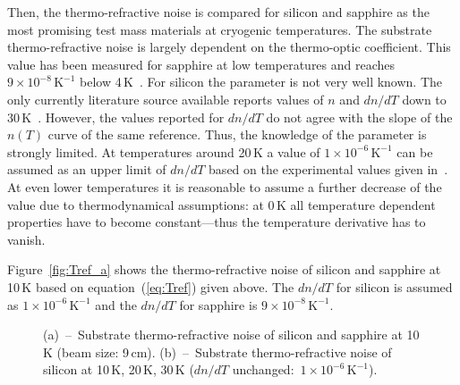 Then, the thermo-refractive noise is compared for silicon and sapphire as the most promising test mass materials at cryogenic temperatures. The substrate thermo-refractive noise is largely dependent on the thermo-optic coefficient. This value has been measured for sapphire at low temperatures and reaches $9\times 10^{-8}\,\mathrm{K}^{-1}$ below 4\,K~\cite{Tomaru2002a}. For silicon the parameter is not very well known. The only currently literature source available reports values of $n$ and $dn/dT$ down to 30\,K~\cite{Frey2006}. However, the values reported for $dn/dT$ do not agree with the slope of the $n(T)$ curve of the same reference. Thus, the knowledge of the parameter is strongly limited. At temperatures around 20\,K a value of $1\times10^{-6}\,\mathrm{K}^{-1}$ can be assumed as an upper limit of $dn/dT$ based on the experimental values given in~\cite{Frey2006}. At even lower temperatures it is reasonable to assume a further decrease of the value due to thermodynamical assumptions: at 0\,K all temperature dependent properties have to become constant---thus the temperature derivative has to vanish.

Figure~\ref{fig:Tref_a} shows the thermo-refractive noise of silicon and sapphire at 10\,K based on equation~(\ref{eq:Tref}) given above. The $dn/dT$ for silicon is assumed as $1\times10^{-6}\,\mathrm{K}^{-1}$ and the $dn/dT$ for sapphire is $9\times10^{-8}\,\mathrm{K}^{-1}$.

\begin{figure}[!h]
\begin{center}
\caption{(a)~--~Substrate thermo-refractive noise of silicon and sapphire at 10\,K (beam size: 9\,cm). (b)~--~Substrate thermo-refractive noise of silicon at 10\,K, 20\,K, 30\,K ($dn/dT$ unchanged:\ $1\times10^{-6}\,\mathrm{K}^{-1}$).}
\end{center}
\end{figure}

